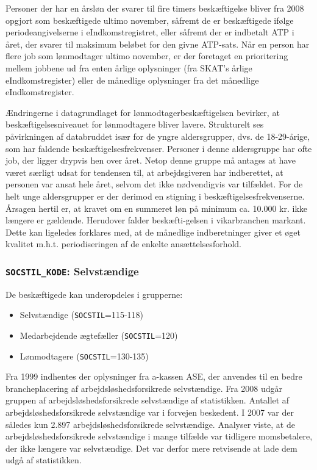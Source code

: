 {Personer der har en årsløn der svarer til fire timers beskæftigelse bliver fra 2008 opgjort som beskæftigede ultimo november, såfremt de er beskæftigede ifølge periodeangivelserne i eIndkomstregistret, eller såfremt der er indbetalt ATP i året, der svarer til maksimum beløbet for den givne ATP-sats. Når en person har flere job som lønmodtager ultimo november, er der foretaget en prioritering mellem jobbene ud fra enten årlige oplysninger (fra SKAT's årlige eIndkomstregister) eller de månedlige oplysninger fra det månedlige eIndkomstregister.

Ændringerne i datagrundlaget for lønmodtagerbeskæftigelsen bevirker, at beskæftigelsesniveauet for lønmodtagere bliver lavere. Strukturelt ses påvirkningen af databruddet især for de yngre aldersgrupper, dvs. de 18-29-årige, som har faldende beskæftigelsesfrekvenser. Personer i denne aldersgruppe har ofte job, der ligger drypvis hen over året. Netop denne gruppe må antages at have været særligt udsat for tendensen til, at arbejdsgiveren har indberettet, at personen var ansat hele året, selvom det ikke nødvendigvis var tilfældet. For de helt unge aldersgrupper er der derimod en stigning i beskæftigelsesfrekvenserne. Årsagen hertil er, at kravet om en summeret løn på minimum ca. 10.000 kr. ikke længere er gældende. Herudover falder beskæfti-gelsen i vikarbranchen markant. Dette kan ligeledes forklares med, at de månedlige indberetninger giver et øget kvalitet m.h.t. periodiseringen af de enkelte ansættelsesforhold.


\subsubsection{\texttt{SOCSTIL\_KODE}: Selvstændige \label{}}

De beskæftigede kan underopdeles i grupperne:
\begin{itemize} [topsep=6pt,itemsep=-1ex]
  \item Selvstændige (\texttt{SOCSTIL}=115-118)
  \item Medarbejdende ægtefæller (\texttt{SOCSTIL}=120)
  \item Lønmodtagere (\texttt{SOCSTIL}=130-135)
\end{itemize}

Fra 1999 indhentes der oplysninger fra a-kassen ASE, der anvendes til en bedre brancheplacering af arbejdsløshedsforsikrede selvstændige. Fra 2008 udgår gruppen af arbejdsløshedsforsikrede selvstændige af statistikken. Antallet af arbejdsløshedsforsikrede selvstændige var i forvejen beskedent. I 2007 var der således kun 2.897 arbejdsløshedsforsikrede selvstændige. Analyser viste, at de arbejdsløshedsforsikrede selvstændige i mange tilfælde var tidligere momsbetalere, der ikke længere var selvstændige. Det var derfor mere retvisende at lade dem udgå af statistikken.


}
